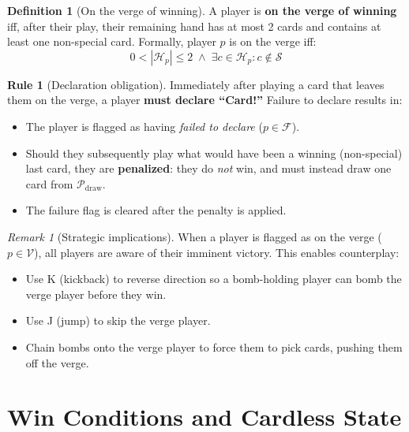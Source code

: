 \documentclass[11pt,a4paper,twoside]{article}
\theoremstyle{definition}
\newtheorem{definition}{Definition}[section]
\newtheorem{rule}{Rule}[section]
\theoremstyle{remark}
\newtheorem{remark}{Remark}[section]
\newcommand{\Hand}{\ensuremath{\mathcal{H}}}
\newcommand{\Pile}{\ensuremath{\mathcal{P}}}
\newcommand{\OnVerge}{\ensuremath{\mathcal{V}}}
\newcommand{\Failed}{\ensuremath{\mathcal{F}}}
\newcommand{\Special}{\ensuremath{\mathcal{S}}}
\begin{document}
\begin{definition}[On the verge of winning]
  A player is \textbf{on the verge of winning} iff, after their play, their
  remaining hand has at most 2 cards and contains at least one non-special
  card. Formally, player $p$ is on the verge iff:
  \[
  0 < |\Hand_p| \leq 2 \;\land\; \exists c \in \Hand_p : c \notin \Special
  \]
\end{definition}

\begin{rule}[Declaration obligation]
  Immediately after playing a card that leaves them on the verge, a player
  \textbf{must declare ``Card!''} Failure to declare results in:
  \begin{itemize}[nosep]
    \item The player is flagged as having \emph{failed to declare}
          ($p \in \Failed$).
    \item Should they subsequently play what would have been a winning
          (non-special) last card, they are \textbf{penalized}: they do
          \emph{not} win, and must instead draw one card from
          $\Pile_{\text{draw}}$.
    \item The failure flag is cleared after the penalty is applied.
  \end{itemize}
\end{rule}

\begin{remark}[Strategic implications]
  When a player is flagged as on the verge ($p \in \OnVerge$), all players
  are aware of their imminent victory. This enables counterplay:
  \begin{itemize}[nosep]
    \item Use K (kickback) to reverse direction so a bomb-holding player can
          bomb the verge player before they win.
    \item Use J (jump) to skip the verge player.
    \item Chain bombs onto the verge player to force them to pick cards,
          pushing them off the verge.
  \end{itemize}
\end{remark}

\section{Win Conditions and Cardless State}
\label{sec:win}
\end{document}
